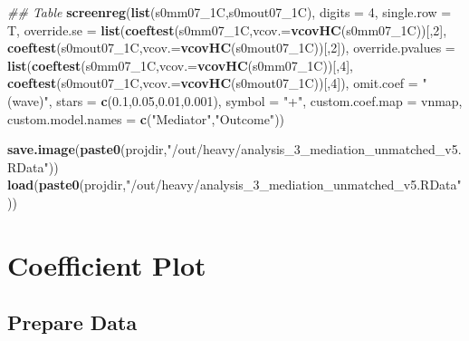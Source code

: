 \documentclass[
]{article}
\newenvironment{Shaded}{\begin{snugshade}}{\end{snugshade}}
\newcommand{\CommentTok}[1]{\textcolor[rgb]{0.56,0.35,0.01}{\textit{#1}}}
\newcommand{\DataTypeTok}[1]{\textcolor[rgb]{0.13,0.29,0.53}{#1}}
\newcommand{\DecValTok}[1]{\textcolor[rgb]{0.00,0.00,0.81}{#1}}
\newcommand{\FloatTok}[1]{\textcolor[rgb]{0.00,0.00,0.81}{#1}}
\newcommand{\KeywordTok}[1]{\textcolor[rgb]{0.13,0.29,0.53}{\textbf{#1}}}
\newcommand{\NormalTok}[1]{#1}
\newcommand{\StringTok}[1]{\textcolor[rgb]{0.31,0.60,0.02}{#1}}
\begin{document}
\begin{Shaded}
\begin{Highlighting}[]
\CommentTok{## Table}
\KeywordTok{screenreg}\NormalTok{(}\KeywordTok{list}\NormalTok{(s0mm07_1C,s0mout07_1C), }\DataTypeTok{digits =} \DecValTok{4}\NormalTok{, }\DataTypeTok{single.row =}\NormalTok{ T,}
          \DataTypeTok{override.se =} \KeywordTok{list}\NormalTok{(}\KeywordTok{coeftest}\NormalTok{(s0mm07_1C,}\DataTypeTok{vcov.=}\KeywordTok{vcovHC}\NormalTok{(s0mm07_1C))[,}\DecValTok{2}\NormalTok{],}
                             \KeywordTok{coeftest}\NormalTok{(s0mout07_1C,}\DataTypeTok{vcov.=}\KeywordTok{vcovHC}\NormalTok{(s0mout07_1C))[,}\DecValTok{2}\NormalTok{]),}
          \DataTypeTok{override.pvalues =} \KeywordTok{list}\NormalTok{(}\KeywordTok{coeftest}\NormalTok{(s0mm07_1C,}\DataTypeTok{vcov.=}\KeywordTok{vcovHC}\NormalTok{(s0mm07_1C))[,}\DecValTok{4}\NormalTok{],}
                                  \KeywordTok{coeftest}\NormalTok{(s0mout07_1C,}\DataTypeTok{vcov.=}\KeywordTok{vcovHC}\NormalTok{(s0mout07_1C))[,}\DecValTok{4}\NormalTok{]),}
          \DataTypeTok{omit.coef =} \StringTok{"(wave)"}\NormalTok{, }\DataTypeTok{stars =} \KeywordTok{c}\NormalTok{(}\FloatTok{0.1}\NormalTok{,}\FloatTok{0.05}\NormalTok{,}\FloatTok{0.01}\NormalTok{,}\FloatTok{0.001}\NormalTok{), }\DataTypeTok{symbol =} \StringTok{"+"}\NormalTok{,}
          \DataTypeTok{custom.coef.map =}\NormalTok{ vnmap, }
          \DataTypeTok{custom.model.names =} \KeywordTok{c}\NormalTok{(}\StringTok{"Mediator"}\NormalTok{,}\StringTok{"Outcome"}\NormalTok{))}
\end{Highlighting}
\end{Shaded}

\begin{Shaded}
\begin{Highlighting}[]
\KeywordTok{save.image}\NormalTok{(}\KeywordTok{paste0}\NormalTok{(projdir,}\StringTok{"/out/heavy/analysis_3_mediation_unmatched_v5.RData"}\NormalTok{))}
\KeywordTok{load}\NormalTok{(}\KeywordTok{paste0}\NormalTok{(projdir,}\StringTok{"/out/heavy/analysis_3_mediation_unmatched_v5.RData"}\NormalTok{))}
\end{Highlighting}
\end{Shaded}

\hypertarget{coefficient-plot}{%
\section{Coefficient Plot}\label{coefficient-plot}}

\hypertarget{prepare-data}{%
\subsection{Prepare Data}\label{prepare-data}}
\end{document}
